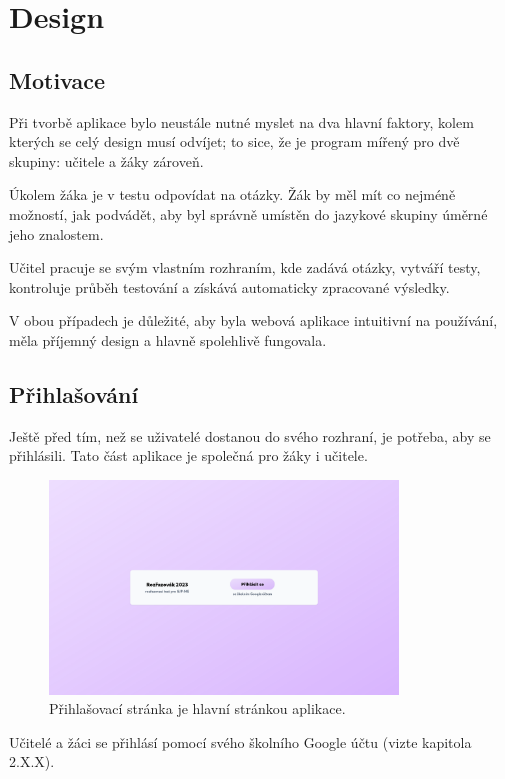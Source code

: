 \hypertarget{Design}{\chapter{Design}}

\section{Motivace}

Při tvorbě aplikace bylo neustále nutné myslet na dva hlavní faktory, kolem kterých se celý design musí odvíjet; to sice, že je program mířený pro dvě skupiny: učitele a žáky zároveň.

Úkolem žáka je v testu odpovídat na otázky. Žák by měl mít co nejméně možností, jak podvádět, aby byl správně umístěn do jazykové skupiny úměrné jeho znalostem.

Učitel pracuje se svým vlastním rozhraním, kde zadává otázky, vytváří testy, kontroluje průběh testování a získává automaticky zpracované výsledky.

V obou případech je důležité, aby byla webová aplikace intuitivní na používání, měla příjemný design a hlavně spolehlivě fungovala.

\section{Přihlašování}

Ještě před tím, než se uživatelé dostanou do svého rozhraní, je potřeba, aby se přihlásili. Tato část aplikace je společná pro žáky i učitele. 

\begin{figure}[H]
    \centering
    \includegraphics[width=350px]{images/01design/login.png}
    \caption{Přihlašovací stránka je hlavní stránkou aplikace.}
\end{figure}

Učitelé a žáci se přihlásí pomocí svého školního Google účtu (vizte kapitola 2.X.X).

